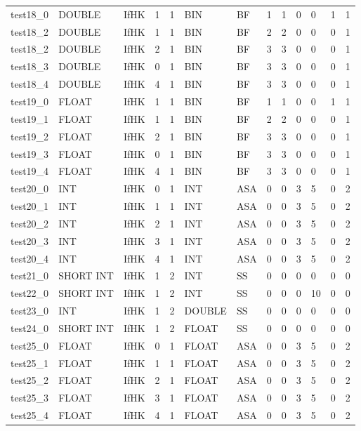 \begin{longtable}{|l|l|l|p{0.5cm}|p{0.5cm}|l|p{0.5cm}|p{0.5cm}|p{0.5cm}|l|l|p{0.5cm}|l|}
test18\_0 & DOUBLE & IfHK & 1 & 1 & BIN & BF & 1 & 1 & 0 & 0 & 1 & 1 \\
test18\_2 & DOUBLE & IfHK & 1 & 1 & BIN & BF & 2 & 2 & 0 & 0 & 0 & 1 \\
test18\_2 & DOUBLE & IfHK & 2 & 1 & BIN & BF & 3 & 3 & 0 & 0 & 0 & 1 \\
test18\_3 & DOUBLE & IfHK & 0 & 1 & BIN & BF & 3 & 3 & 0 & 0 & 0 & 1 \\
test18\_4 & DOUBLE & IfHK & 4 & 1 & BIN & BF & 3 & 3 & 0 & 0 & 0 & 1 \\
test19\_0 & FLOAT & IfHK & 1 & 1 & BIN & BF & 1 & 1 & 0 & 0 & 1 & 1 \\
test19\_1 & FLOAT & IfHK & 1 & 1 & BIN & BF & 2 & 2 & 0 & 0 & 0 & 1 \\
test19\_2 & FLOAT & IfHK & 2 & 1 & BIN & BF & 3 & 3 & 0 & 0 & 0 & 1 \\
test19\_3 & FLOAT & IfHK & 0 & 1 & BIN & BF & 3 & 3 & 0 & 0 & 0 & 1 \\
test19\_4 & FLOAT & IfHK & 4 & 1 & BIN & BF & 3 & 3 & 0 & 0 & 0 & 1 \\
test20\_0 & INT & IfHK & 0 & 1 & INT & ASA & 0 & 0 & 3 & 5 & 0 & 2 \\
test20\_1 & INT & IfHK & 1 & 1 & INT & ASA & 0 & 0 & 3 & 5 & 0 & 2 \\
test20\_2 & INT & IfHK & 2 & 1 & INT & ASA & 0 & 0 & 3 & 5 & 0 & 2 \\
test20\_3 & INT & IfHK & 3 & 1 & INT & ASA & 0 & 0 & 3 & 5 & 0 & 2 \\
test20\_4 & INT & IfHK & 4 & 1 & INT & ASA & 0 & 0 & 3 & 5 & 0 & 2 \\
test21\_0 & SHORT INT & IfHK & 1 & 2 & INT & SS & 0 & 0 & 0 & 0 & 0 & 0 \\
test22\_0 & SHORT INT & IfHK & 1 & 2 & INT & SS & 0 & 0 & 0 & 10 & 0 & 0 \\
test23\_0 & INT & IfHK & 1 & 2 & DOUBLE & SS & 0 & 0 & 0 & 0 & 0 & 0 \\
test24\_0 & SHORT INT & IfHK & 1 & 2 & FLOAT & SS & 0 & 0 & 0 & 0 & 0 & 0 \\
test25\_0 & FLOAT & IfHK & 0 & 1 & FLOAT & ASA & 0 & 0 & 3 & 5 & 0 & 2 \\
test25\_1 & FLOAT & IfHK & 1 & 1 & FLOAT & ASA & 0 & 0 & 3 & 5 & 0 & 2 \\
test25\_2 & FLOAT & IfHK & 2 & 1 & FLOAT & ASA & 0 & 0 & 3 & 5 & 0 & 2 \\
test25\_3 & FLOAT & IfHK & 3 & 1 & FLOAT & ASA & 0 & 0 & 3 & 5 & 0 & 2 \\
test25\_4 & FLOAT & IfHK & 4 & 1 & FLOAT & ASA & 0 & 0 & 3 & 5 & 0 & 2 \\

\end{longtable}
